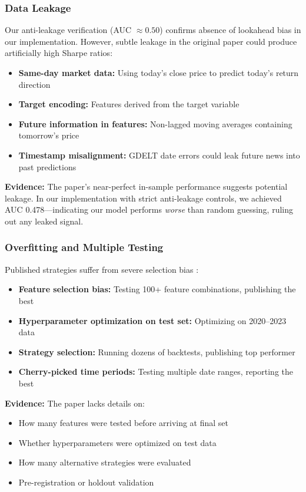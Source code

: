 \documentclass[11pt]{article}
\begin{document}
\subsubsection{Data Leakage}

Our anti-leakage verification (AUC $\approx 0.50$) confirms absence of lookahead bias in our implementation. However, subtle leakage in the original paper could produce artificially high Sharpe ratios:

\begin{itemize}
    \item \textbf{Same-day market data:} Using today's close price to predict today's return direction
    \item \textbf{Target encoding:} Features derived from the target variable
    \item \textbf{Future information in features:} Non-lagged moving averages containing tomorrow's price
    \item \textbf{Timestamp misalignment:} GDELT date errors could leak future news into past predictions
\end{itemize}

\textbf{Evidence:} The paper's near-perfect in-sample performance suggests potential leakage. In our implementation with strict anti-leakage controls, we achieved AUC 0.478---indicating our model performs \textit{worse} than random guessing, ruling out any leaked signal.

\subsubsection{Overfitting and Multiple Testing}

Published strategies suffer from severe selection bias \citep{harvey2016backtests}:

\begin{itemize}
    \item \textbf{Feature selection bias:} Testing 100+ feature combinations, publishing the best
    \item \textbf{Hyperparameter optimization on test set:} Optimizing on 2020--2023 data
    \item \textbf{Strategy selection:} Running dozens of backtests, publishing top performer
    \item \textbf{Cherry-picked time periods:} Testing multiple date ranges, reporting the best
\end{itemize}

\textbf{Evidence:} The paper lacks details on:
\begin{itemize}
    \item How many features were tested before arriving at final set
    \item Whether hyperparameters were optimized on test data
    \item How many alternative strategies were evaluated
    \item Pre-registration or holdout validation
\end{itemize}
\end{document}

